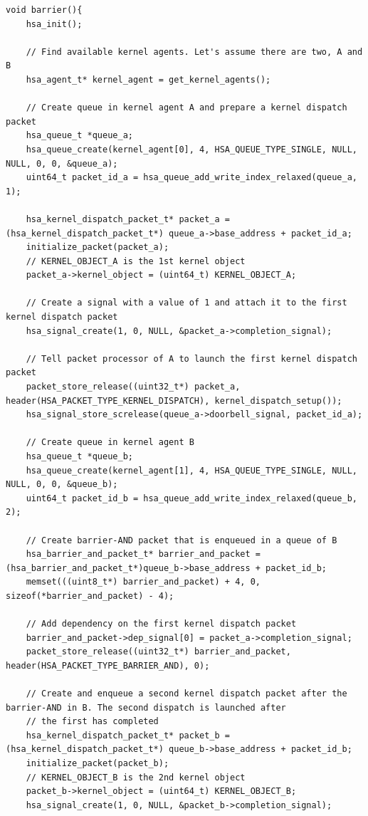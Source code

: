 \documentclass[final,oneside]{book}
\begin{document}
\begin{lstlisting}
void barrier(){
    hsa_init();

    // Find available kernel agents. Let's assume there are two, A and B
    hsa_agent_t* kernel_agent = get_kernel_agents();

    // Create queue in kernel agent A and prepare a kernel dispatch packet
    hsa_queue_t *queue_a;
    hsa_queue_create(kernel_agent[0], 4, HSA_QUEUE_TYPE_SINGLE, NULL, NULL, 0, 0, &queue_a);
    uint64_t packet_id_a = hsa_queue_add_write_index_relaxed(queue_a, 1);

    hsa_kernel_dispatch_packet_t* packet_a =  (hsa_kernel_dispatch_packet_t*) queue_a->base_address + packet_id_a;
    initialize_packet(packet_a);
    // KERNEL_OBJECT_A is the 1st kernel object
    packet_a->kernel_object = (uint64_t) KERNEL_OBJECT_A;

    // Create a signal with a value of 1 and attach it to the first kernel dispatch packet
    hsa_signal_create(1, 0, NULL, &packet_a->completion_signal);

    // Tell packet processor of A to launch the first kernel dispatch packet
    packet_store_release((uint32_t*) packet_a, header(HSA_PACKET_TYPE_KERNEL_DISPATCH), kernel_dispatch_setup());
    hsa_signal_store_screlease(queue_a->doorbell_signal, packet_id_a);

    // Create queue in kernel agent B
    hsa_queue_t *queue_b;
    hsa_queue_create(kernel_agent[1], 4, HSA_QUEUE_TYPE_SINGLE, NULL, NULL, 0, 0, &queue_b);
    uint64_t packet_id_b = hsa_queue_add_write_index_relaxed(queue_b, 2);

    // Create barrier-AND packet that is enqueued in a queue of B
    hsa_barrier_and_packet_t* barrier_and_packet = (hsa_barrier_and_packet_t*)queue_b->base_address + packet_id_b;
    memset(((uint8_t*) barrier_and_packet) + 4, 0, sizeof(*barrier_and_packet) - 4);

    // Add dependency on the first kernel dispatch packet
    barrier_and_packet->dep_signal[0] = packet_a->completion_signal;
    packet_store_release((uint32_t*) barrier_and_packet, header(HSA_PACKET_TYPE_BARRIER_AND), 0);

    // Create and enqueue a second kernel dispatch packet after the barrier-AND in B. The second dispatch is launched after
    // the first has completed
    hsa_kernel_dispatch_packet_t* packet_b =  (hsa_kernel_dispatch_packet_t*) queue_b->base_address + packet_id_b;
    initialize_packet(packet_b);
    // KERNEL_OBJECT_B is the 2nd kernel object
    packet_b->kernel_object = (uint64_t) KERNEL_OBJECT_B;
    hsa_signal_create(1, 0, NULL, &packet_b->completion_signal);


\end{lstlisting}
\end{document}
